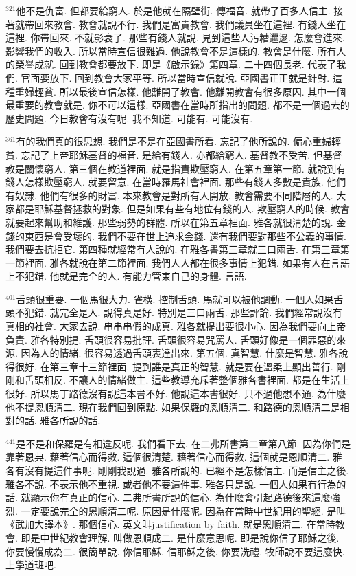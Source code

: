 \documentclass{book}
\begin{document}
$^{321}$他不是仇富.
但都要給窮人.
於是他就在隔壁街.
傳福音.
就帶了百多人信主.
接著就帶回來教會.
教會就說不行.
我們是富貴教會.
我們議員坐在這裡.
有錢人坐在這裡.
你帶回來.
不就影衰了.
那些有錢人就說.
見到這些人污糟邋遢.
怎麼會進來.
影響我們的收入.
所以當時宣信很難過.
他說教會不是這樣的.
教會是什麼.
所有人的榮譽成就.
回到教會都要放下.
即是《啟示錄》第四章.
二十四個長老.
代表了我們.
官面要放下.
回到教會大家平等.
所以當時宣信就說.
亞國書正正就是針對.
這種重婦輕貧.
所以最後宣信怎樣.
他離開了教會.
他離開教會有很多原因.
其中一個最重要的教會就是.
你不可以這樣.
亞國書在當時所指出的問題.
都不是一個過去的歷史問題.
今日教會有沒有呢.
我不知道.
可能有.
可能沒有.

$^{361}$有的我們真的很思想.
我們是不是在亞國書所看.
忘記了他所說的.
偏心重婦輕貧.
忘記了上帝耶穌基督的福音.
是給有錢人.
亦都給窮人.
基督教不受苦.
但基督教是關懷窮人.
第三個在教道裡面.
就是指責欺壓窮人.
在第五章第一節.
就說到有錢人怎樣欺壓窮人.
就要留意.
在當時羅馬社會裡面.
那些有錢人多數是貴族.
他們有奴隸.
他們有很多的財富.
本來教會是對所有人開放.
教會需要不同階層的人.
大家都是耶穌基督拯救的對象.
但是如果有些有地位有錢的人.
欺壓窮人的時候.
教會就要起來幫助和維護.
那些弱勢的群體.
所以在第五章裡面.
雅各就很清楚的說.
金錢的東西是會受壞的.
我們不要在世上追求金錢.
還有我們要對那些不公義的事情.
我們要去抗拒它.
第四種就經常有人說的.
在雅各書第三章就三口兩舌.
在第三章第一節裡面.
雅各就說在第二節裡面.
我們人人都在很多事情上犯錯.
如果有人在言語上不犯錯.
他就是完全的人.
有能力管束自己的身體.
言語.

$^{401}$舌頭很重要.
一個馬很大力.
雀橫.
控制舌頭.
馬就可以被他調動.
一個人如果舌頭不犯錯.
就完全是人.
說得真是好.
特別是三口兩舌.
那些評論.
我們經常說沒有真相的社會.
大家去說.
串串串假的成真.
雅各就提出要很小心.
因為我們要向上帝負責.
雅各特別提.
舌頭很容易批評.
舌頭很容易咒罵人.
舌頭好像是一個罪惡的來源.
因為人的情緒.
很容易透過舌頭表達出來.
第五個.
真智慧.
什麼是智慧.
雅各說得很好.
在第三章十三節裡面.
提到誰是真正的智慧.
就是要在溫柔上顯出善行.
剛剛和舌頭相反.
不讓人的情緒做主.
這些教導充斥著整個雅各書裡面.
都是在生活上很好.
所以馬丁路德沒有說這本書不好.
他說這本書很好.
只不過他想不通.
為什麼他不提恩順清二.
現在我們回到原點.
如果保羅的恩順清二.
和路德的恩順清二是相對的話.
雅各所說的話.

$^{441}$是不是和保羅是有相違反呢.
我們看下去.
在二弗所書第二章第八節.
因為你們是靠著恩典.
藉著信心而得救.
這個很清楚.
藉著信心而得救.
這個就是恩順清二.
雅各有沒有提這件事呢.
剛剛我說過.
雅各所說的.
已經不是怎樣信主.
而是信主之後.
雅各不說.
不表示他不重視.
或者他不要這件事.
雅各只是說.
一個人如果有行為的話.
就顯示你有真正的信心.
二弗所書所說的信心.
為什麼會引起路德後來這麼強烈.
一定要說完全的恩順清二呢.
原因是什麼呢.
因為在當時中世紀用的聖經.
是叫《武加大譯本》.
那個信心.
英文叫justification by faith.
就是恩順清二.
在當時教會.
即是中世紀教會理解.
叫做恩順成二.
是什麼意思呢.
即是說你信了耶穌之後.
你要慢慢成為二.
很簡單說.
你信耶穌.
信耶穌之後.
你要洗禮.
牧師說不要這麼快.
上學道班吧.
\end{document}
